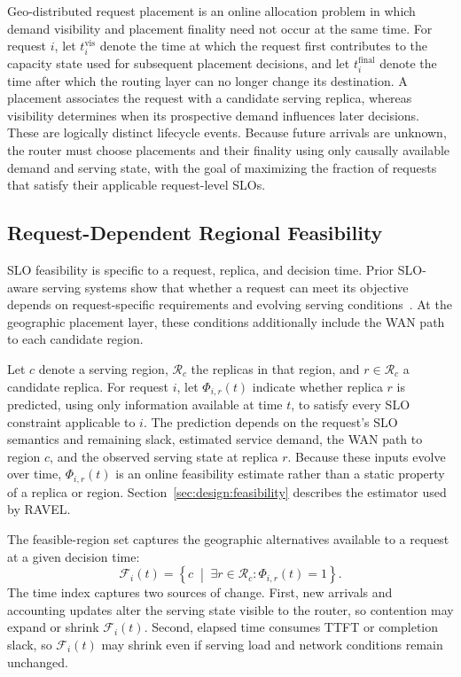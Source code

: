 \documentclass[letterpaper,twocolumn,10pt]{article}
\begin{document}
Geo-distributed request placement is an online allocation problem in which
demand visibility and placement finality need not occur at the same time.
For request $i$, let $t_i^{\mathrm{vis}}$ denote the time at which the request
first contributes to the capacity state used for subsequent placement
decisions, and let $t_i^{\mathrm{final}}$ denote the time after which the
routing layer can no longer change its destination.
A placement associates the request with a candidate serving replica, whereas
visibility determines when its prospective demand influences later decisions.
These are logically distinct lifecycle events.
Because future arrivals are unknown, the router must choose placements and
their finality using only causally available demand and serving state, with the
goal of maximizing the fraction of requests that satisfy their applicable
request-level SLOs.


\subsection{Request-Dependent Regional Feasibility}
\label{sec:problem:feasibility}

SLO feasibility is specific to a request, replica, and decision time.
Prior SLO-aware serving systems show that whether a request can meet its
objective depends on request-specific requirements and evolving serving
conditions~\cite{distserve,jitserve,quartz,andes}.
At the geographic placement layer, these conditions additionally include the
WAN path to each candidate region.

Let $c$ denote a serving region, $\mathcal{R}_c$ the replicas in that region,
and $r\in\mathcal{R}_c$ a candidate replica.
For request $i$, let $\Phi_{i,r}(t)$ indicate whether replica $r$ is predicted,
using only information available at time $t$, to satisfy every SLO constraint
applicable to $i$.
The prediction depends on the request's SLO semantics and remaining slack,
estimated service demand, the WAN path to region $c$, and the observed serving
state at replica $r$.
Because these inputs evolve over time, $\Phi_{i,r}(t)$ is an online feasibility
estimate rather than a static property of a replica or region.
Section~\ref{sec:design:feasibility} describes the estimator used by RAVEL.

The feasible-region set captures the geographic alternatives available to a
request at a given decision time:
\begin{equation}
    \mathcal{F}_i(t)
    =
    \left\{
        c
        \;\middle|\;
        \exists r\in\mathcal{R}_c:
        \Phi_{i,r}(t)=1
    \right\}.
    \label{eq:problem:feasible-set}
\end{equation}
The time index captures two sources of change.
First, new arrivals and accounting updates alter the serving state visible to
the router, so contention may expand or shrink $\mathcal{F}_i(t)$.
Second, elapsed time consumes TTFT or completion slack, so
$\mathcal{F}_i(t)$ may shrink even if serving load and network conditions remain
unchanged.
\end{document}
